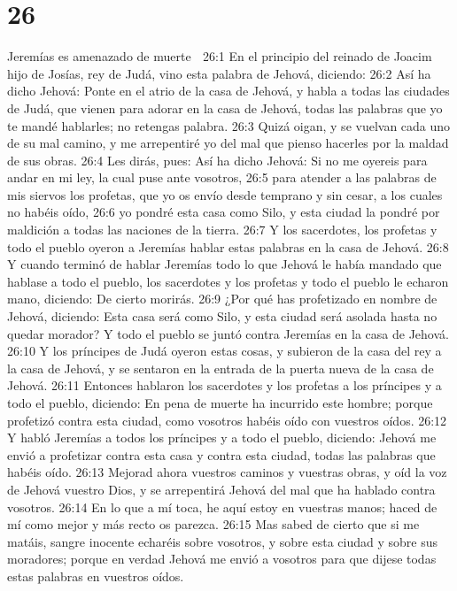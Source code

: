 \chapter{26}

Jeremías es amenazado de muerte  

26:1 En el principio del reinado de Joacim hijo de Josías, rey de Judá, vino esta palabra de Jehová, diciendo:  
26:2 Así ha dicho Jehová: Ponte en el atrio de la casa de Jehová, y habla a todas las ciudades de Judá, que vienen para adorar en la casa de Jehová, todas las palabras que yo te mandé hablarles; no retengas palabra.  
26:3 Quizá oigan, y se vuelvan cada uno de su mal camino, y me arrepentiré yo del mal que pienso hacerles por la maldad de sus obras.  
26:4 Les dirás, pues: Así ha dicho Jehová: Si no me oyereis para andar en mi ley, la cual puse ante vosotros,  
26:5 para atender a las palabras de mis siervos los profetas, que yo os envío desde temprano y sin cesar, a los cuales no habéis oído,  
26:6 yo pondré esta casa como Silo, y esta ciudad la pondré por maldición a todas las naciones de la tierra.  
26:7 Y los sacerdotes, los profetas y todo el pueblo oyeron a Jeremías hablar estas palabras en la casa de Jehová.  
26:8 Y cuando terminó de hablar Jeremías todo lo que Jehová le había mandado que hablase a todo el pueblo, los sacerdotes y los profetas y todo el pueblo le echaron mano, diciendo: De cierto morirás.  
26:9 ¿Por qué has profetizado en nombre de Jehová, diciendo: Esta casa será como Silo, y esta ciudad será asolada hasta no quedar morador? Y todo el pueblo se juntó contra Jeremías en la casa de Jehová.  
26:10 Y los príncipes de Judá oyeron estas cosas, y subieron de la casa del rey a la casa de Jehová, y se sentaron en la entrada de la puerta nueva de la casa de Jehová.  
26:11 Entonces hablaron los sacerdotes y los profetas a los príncipes y a todo el pueblo, diciendo: En pena de muerte ha incurrido este hombre; porque profetizó contra esta ciudad, como vosotros habéis oído con vuestros oídos.  
26:12 Y habló Jeremías a todos los príncipes y a todo el pueblo, diciendo: Jehová me envió a profetizar contra esta casa y contra esta ciudad, todas las palabras que habéis oído.  
26:13 Mejorad ahora vuestros caminos y vuestras obras, y oíd la voz de Jehová vuestro Dios, y se arrepentirá Jehová del mal que ha hablado contra vosotros.  
26:14 En lo que a mí toca, he aquí estoy en vuestras manos; haced de mí como mejor y más recto os parezca.  
26:15 Mas sabed de cierto que si me matáis, sangre inocente echaréis sobre vosotros, y sobre esta ciudad y sobre sus moradores; porque en verdad Jehová me envió a vosotros para que dijese todas estas palabras en vuestros oídos.  
